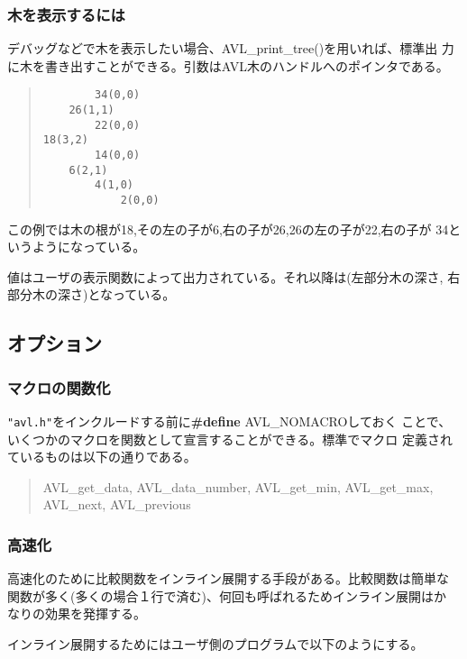 \subsubsection{木を表示するには}
デバッグなどで木を表示したい場合、AVL\_print\_tree()を用いれば、標準出
力に木を書き出すことができる。引数はAVL木のハンドルへのポインタである。
\begin{quote}
\begin{verbatim}
        34(0,0)
    26(1,1)
        22(0,0)
18(3,2)
        14(0,0)
    6(2,1)
        4(1,0)
            2(0,0)
\end{verbatim}
\end{quote}
この例では木の根が18,その左の子が6,右の子が26,26の左の子が22,右の子が
34というようになっている。

値はユーザの表示関数によって出力されている。それ以降は(左部分木の深さ,
右部分木の深さ)となっている。

\subsection{オプション}
\subsubsection{マクロの関数化}
\label{use-macro}

\verb+"avl.h"+をインクルードする前に{\bf\#define} AVL\_NOMACROしておく
ことで、いくつかのマクロを関数として宣言することができる。標準でマクロ
定義されているものは以下の通りである。

\begin{quote}
AVL\_get\_data, AVL\_data\_number, AVL\_get\_min, AVL\_get\_max,
AVL\_next, AVL\_previous
\end{quote}

\subsubsection{高速化}
高速化のために比較関数をインライン展開する手段がある。比較関数は簡単な
関数が多く(多くの場合１行で済む)、何回も呼ばれるためインライン展開はか
なりの効果を発揮する。

インライン展開するためにはユーザ側のプログラムで以下のようにする。

